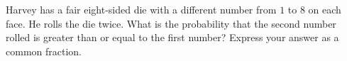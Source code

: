 Harvey has a fair eight-sided die with a different number from $1$ to $8$ on each face. He rolls the die twice. What is the probability that the second number rolled is greater than or equal to the first number? Express your answer as a common fraction.
